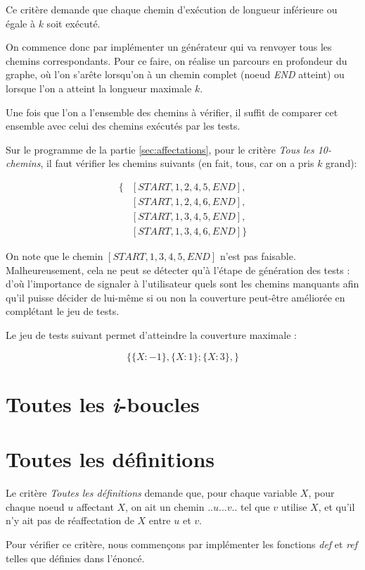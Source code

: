 \documentclass[a4paper, 12pt]{report}
\begin{document}
Ce critère demande que chaque chemin d'exécution de longueur inférieure ou égale à $k$ soit exécuté.

On commence donc par implémenter un générateur qui va renvoyer tous les chemins correspondants. Pour ce faire, on réalise un parcours en profondeur du graphe, où l'on s'arête lorsqu'on à un chemin complet (noeud \textit{END} atteint) ou lorsque l'on a atteint la longueur maximale $k$.

Une fois que l'on a l'ensemble des chemins à vérifier, il suffit de comparer cet ensemble avec celui des chemins exécutés par les tests.

Sur le programme de la partie \ref{sec:affectations}, pour le critère \textit{Tous les 10-chemins}, il faut vérifier les chemins suivants (en fait, tous, car on a pris $k$ grand):

\begin{align*}
\{
	&[START, 1, 2, 4, 5, END],\\
	&[START, 1, 2, 4, 6, END],\\
	&[START, 1, 3, 4, 5, END],\\
	&[START, 1, 3, 4, 6, END]
\}
\end{align*}

On note que le chemin $[START, 1, 3, 4, 5, END]$ n'est pas faisable. Malheureusement, cela ne peut se détecter qu'à l'étape de génération des tests  : d'où l'importance de signaler à l'utilisateur quels sont les chemins manquants afin qu'il puisse décider de lui-même si ou non la couverture peut-être améliorée en complétant le jeu de tests.

Le jeu de tests suivant permet d'atteindre la couverture maximale :

\[ \{
	\{ X : -1\},
	\{ X : 1\};
	\{ X : 3\},
\} \]


\section{Toutes les \textit{i}-boucles}
\section{Toutes les définitions}

Le critère \textit{Toutes les définitions} demande que, pour chaque variable $X$, pour chaque noeud $u$ affectant $X$, on ait un chemin $..u...v..$ tel que $v$ utilise $X$, et qu'il n'y ait pas de réaffectation de $X$ entre $u$ et $v$.

Pour vérifier ce critère, nous commençons par implémenter les fonctions \textit{def} et \textit{ref} telles que définies dans l'énoncé.
\end{document}
